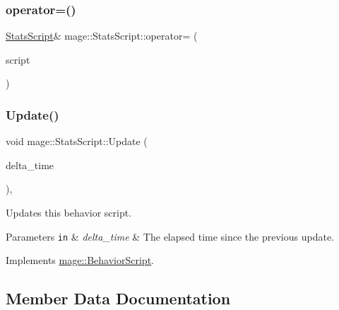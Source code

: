 \hypertarget{classmage_1_1_stats_script_a6adacd651debb83254e1121f32c8f21e}{}\label{classmage_1_1_stats_script_a6adacd651debb83254e1121f32c8f21e} 
\subsubsection{\texorpdfstring{operator=()}{operator=()}\hspace{0.1cm}{\footnotesize\ttfamily [2/2]}}
{\footnotesize\ttfamily \hyperlink{classmage_1_1_stats_script}{Stats\+Script}\& mage\+::\+Stats\+Script\+::operator= (\begin{DoxyParamCaption}\item[{\hyperlink{classmage_1_1_stats_script}{Stats\+Script} \&\&}]{script }\end{DoxyParamCaption})\hspace{0.3cm}{\ttfamily [delete]}}

\hypertarget{classmage_1_1_stats_script_abb2f4de15b51b72e54dc893ecd947fad}{}\label{classmage_1_1_stats_script_abb2f4de15b51b72e54dc893ecd947fad} 
\subsubsection{\texorpdfstring{Update()}{Update()}}
{\footnotesize\ttfamily void mage\+::\+Stats\+Script\+::\+Update (\begin{DoxyParamCaption}\item[{double}]{delta\+\_\+time }\end{DoxyParamCaption})\hspace{0.3cm}{\ttfamily [override]}, {\ttfamily [virtual]}}

Updates this behavior script.


\begin{DoxyParams}[1]{Parameters}
\mbox{\tt in}  & {\em delta\+\_\+time} & The elapsed time since the previous update. \\
\hline
\end{DoxyParams}


Implements \hyperlink{classmage_1_1_behavior_script_a905b6c83640cb91d19fecab3435f6feb}{mage\+::\+Behavior\+Script}.



\subsection{Member Data Documentation}
\hypertarget{classmage_1_1_stats_script_ac12aaf08707f8de8d88391bcc7f81c53}{}\label{classmage_1_1_stats_script_ac12aaf08707f8de8d88391bcc7f81c53} 
